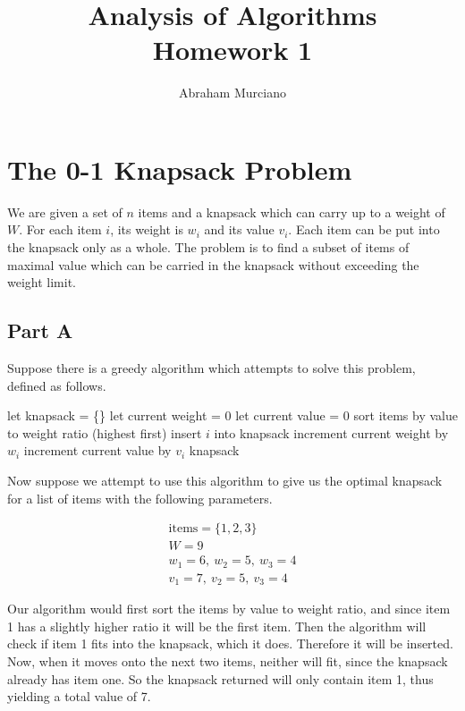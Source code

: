\documentclass{article}
\title{Analysis of Algorithms \\
\medskip
\large Homework 1}
\author{Abraham Murciano}
\begin{document}
\maketitle

\section{The 0-1 Knapsack Problem}

We are given a set of \(n\) items and a knapsack which can carry up to a weight of \(W\). For each item \(i\), its weight is \(w_i\) and its value \(v_i\). Each item can be put into the knapsack only as a whole. The problem is to find a subset of items of maximal value which can be carried in the knapsack without exceeding the weight limit.

\subsection*{Part A}

Suppose there is a greedy algorithm which attempts to solve this problem, defined as follows.

\begin{algorithm}
	\begin{algorithmic}
		\State let knapsack = \{\}
		\State let current weight = 0
		\State let current value = 0
		\State sort items by value to weight ratio (highest first)
		\State insert \(i\) into knapsack
		\State increment current weight by \(w_i\)
		\State increment current value by \(v_i\)
		\EndIf
		\EndFor
		\Return knapsack
		\EndFunction
	\end{algorithmic}
\end{algorithm}

Now suppose we attempt to use this algorithm to give us the optimal knapsack for a list of items with the following parameters.

\begin{gather*}
	\text{items} = \{1, 2, 3\}\\
	W = 9\\
	w_1 = 6,\ w_2 = 5,\ w_3 = 4\\
	v_1 = 7,\ v_2 = 5,\ v_3 = 4
\end{gather*}

Our algorithm would first sort the items by value to weight ratio, and since item 1 has a slightly higher ratio it will be the first item. Then the algorithm will check if item 1 fits into the knapsack, which it does. Therefore it will be inserted. Now, when it moves onto the next two items, neither will fit, since the knapsack already has item one. So the knapsack returned will only contain item 1, thus yielding a total value of 7.
\end{document}
